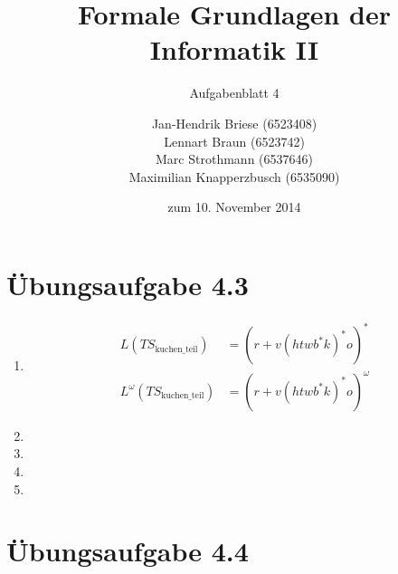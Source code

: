 \documentclass[a4paper]{scrartcl}
\title{Formale Grundlagen der Informatik II}
\subtitle{Aufgabenblatt 4}
\author{
    Jan-Hendrik Briese (6523408) \\
    Lennart Braun (6523742) \\
    Marc Strothmann (6537646) \\
    Maximilian Knapperzbusch (6535090)
}
\date{zum 10. November 2014}
\begin{document}
\maketitle

\section*{Übungsaufgabe 4.3} 
\begin{enumerate}
    \item
        \begin{align*}
            L(TS_\text{kuchen\_teil}) &= \left( r + v \left( htwb^*k \right)^* o \right)^* \\
            L^\omega(TS_\text{kuchen\_teil}) &= \left( r + v \left( htwb^*k \right)^* o \right)^\omega
        \end{align*}

    \item

    \item

    \item

    \item

\end{enumerate}

\section*{Übungsaufgabe 4.4}
\end{document}
